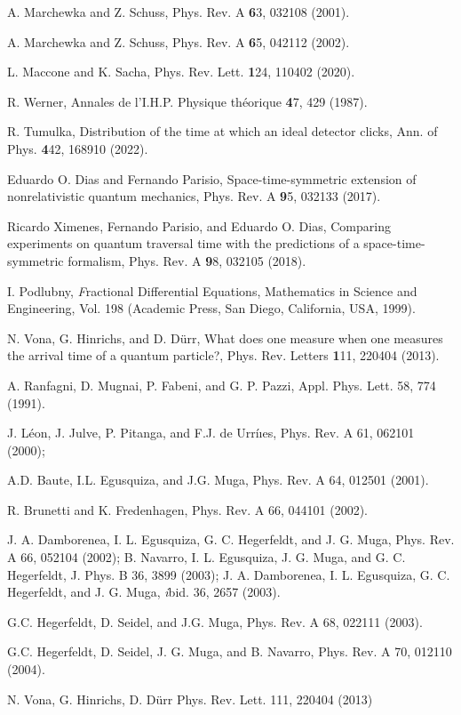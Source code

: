 \begin{thebibliography}{0}
 A. Marchewka and Z. Schuss, Phys. Rev. A {\textbf 63}, 032108 (2001).

 A. Marchewka and Z. Schuss, Phys. Rev. A {\textbf 65}, 042112 (2002).

 L. Maccone and K. Sacha, Phys. Rev. Lett. {\textbf 124}, 110402 (2020).

 R. Werner, Annales de l’I.H.P. Physique th\'eorique {\textbf 47}, 429 (1987).

 R. Tumulka, Distribution of the time at which an ideal detector clicks, Ann. of Phys. {\textbf 442}, 168910 (2022). 



 Eduardo O. Dias and Fernando Parisio, Space-time-symmetric extension of nonrelativistic quantum mechanics, Phys. Rev. A {\textbf 95}, 032133 (2017).

 Ricardo Ximenes, Fernando Parisio, and Eduardo O. Dias, Comparing experiments on quantum traversal time with the predictions of a space-time-symmetric formalism, Phys. Rev. A {\textbf 98}, 032105 (2018).

 I. Podlubny,  {\textit Fractional Differential Equations}, Mathematics in Science and Engineering, Vol. 198 (Academic Press, San Diego, California, USA, 1999).

 N. Vona, G. Hinrichs, and D. D\"urr, What does one measure when one measures the arrival time of a quantum particle?, Phys. Rev. Letters {\textbf 111}, 220404 (2013).

 A. Ranfagni, D. Mugnai, P. Fabeni, and G. P. Pazzi, Appl. Phys. Lett. 58, 774 (1991).

 J. L\'eon, J. Julve, P. Pitanga, and F.J. de Urr\'iıes, Phys. Rev. A 61, 062101 (2000);

 A.D. Baute, I.L. Egusquiza, and J.G. Muga, Phys. Rev. A
64, 012501 (2001).

 R. Brunetti and K. Fredenhagen, Phys. Rev. A 66, 044101 (2002).

 J. A. Damborenea, I. L. Egusquiza, G. C. Hegerfeldt, and J. G. Muga, Phys. Rev. A 66, 052104 (2002); B. Navarro, I. L. Egusquiza, J. G. Muga, and G. C. Hegerfeldt, J. Phys. B 36, 3899 (2003); J. A. Damborenea, I. L. Egusquiza, G. C. Hegerfeldt, and J. G. Muga, {\textit ibid.} 36, 2657 (2003).

 G.C. Hegerfeldt, D. Seidel, and J.G. Muga, Phys. Rev. A 68, 022111 (2003).

 G.C. Hegerfeldt, D. Seidel, J. G. Muga, and B. Navarro, Phys. Rev. A 70, 012110 (2004).

 N. Vona, G. Hinrichs, D. Dürr  Phys. Rev. Lett. 111, 220404 (2013)

\end{thebibliography}